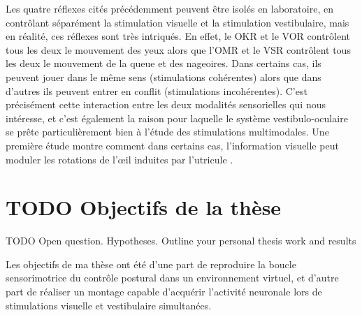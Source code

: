 Les quatre réflexes cités précédemment peuvent être isolés en laboratoire, en contrôlant séparément la stimulation visuelle et la stimulation vestibulaire, mais en réalité, ces réflexes sont très intriqués. En effet, le OKR et le VOR contrôlent tous les deux le mouvement des yeux alors que l'OMR et le VSR contrôlent tous les deux le mouvement de la queue et des nageoires. Dans certains cas, ils peuvent jouer dans le même sens (stimulations cohérentes) alors que dans d'autres ils peuvent entrer en conflit (stimulations incohérentes). C'est précisément cette interaction entre les deux modalités sensorielles qui nous intéresse, et c'est également la raison pour laquelle le système vestibulo-oculaire se prête particulièrement bien à l'étude des stimulations multimodales. Une première étude montre comment dans certains cas, l'information visuelle peut moduler les rotations de l'œil induites par l'utricule \cite{bianco_tangential_2012}.



  \section{TODO Objectifs de la thèse}

TODO Open question. Hypotheses. Outline your personal thesis work and results

Les objectifs de ma thèse ont été d'une part de reproduire la boucle sensorimotrice du contrôle postural dans un environnement virtuel, et d'autre part de réaliser un montage capable d'acquérir l'activité neuronale lors de stimulations visuelle et vestibulaire simultanées.